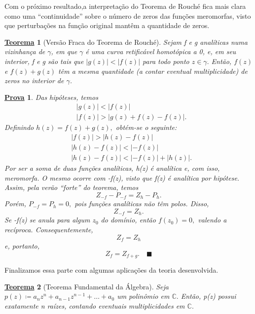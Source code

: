 \documentclass{article}
\newtheorem*{theorem*}{\underline{Teorema}}
\newtheorem*{proof*}{\underline{Prova}}
\renewcommand\qedsymbol{$\blacksquare$}
\begin{document}
  Com o próximo resultado,a interpretação do Teorema de Rouché fica mais clara como uma ``continuidade'' sobre o número de zeros das funções meromorfas,
  visto que perturbações na função original mantêm a quantidade de zeros.
  \begin{theorem*}[Versão Fraca do Teorema de Rouché]
    Sejam f e g analíticas numa vizinhança de \(\gamma \), em que \(\gamma \) é uma curva retificável homotópica a 0, e, em seu interior,
    f e g são tais que \(|g(z)| < |f(z)|\) para todo ponto \(z\in \gamma .\) Então, \(f(z)\) e \(f(z) + g(z)\) têm a mesma quantidade (a contar eventual multiplicidade) de zeros no interior de \(\gamma \).
  \end{theorem*}
  \begin{proof*}
    Das hipóteses, temos 
    \begin{align*}
    &|g(z)| < |f(z)|\\
    &|f(z)| > |g(z) + f(z) - f(z)|.
    \end{align*}
    Definindo \(h(z) = f(z) + g(z),\) obtém-se o seguinte:
    \begin{align*}
    &|f(z)| > |h(z) - f(z)|\\
    &|h(z) - f(z)| < |-f(z)|\\
    &|h(z) - f(z)| < |-f(z)| + |h(z)|.
    \end{align*}
    Por ser a soma de duas funções analíticas, h(z) é analítica e, com isso, meromorfa. O mesmo ocorre com -f(z), visto que f(z) é analítica por hipótese.
    Assim, pela verão ``forte'' do teorema, temos 
    \[
      Z_{-f} - P_{-f} = Z_{h} - P_{h}.
    \]
    Porém, \(P_{-f} = P_{h} = 0,\) pois funções analíticas não têm polos. Disso,
    \[
      Z_{-f} = Z_{h}.
    \]
    Se -f(z) se anula para algum \(z_{0}\) do domínio, então \(f(z_{0}) = 0, \) valendo a recíproca. Consequentemente,
    \[
      Z_{f} = Z_{h}
    \]
    e, portanto, 
    \[
      Z_{f} = Z_{f+g}.\quad \text{\qedsymbol}
    \] 
  \end{proof*}
  Finalizamos essa parte com algumas aplicações da teoria desenvolvida.
  \hypertarget{fundamental-theorem-algebra}{\begin{theorem*}[Teorema Fundamental da Álgebra]
      Seja \(p(z)\coloneqq a_{n}z^{n} + a_{n-1}z^{n-1} + \dotsc + a_{0}\) um polinômio em \(\mathbb{C}.\) Então, p(z) possui exatamente n raízes, contando
      eventuais multiplicidades em \(\mathbb{C}.\)
  \end{theorem*}}
\end{document}

